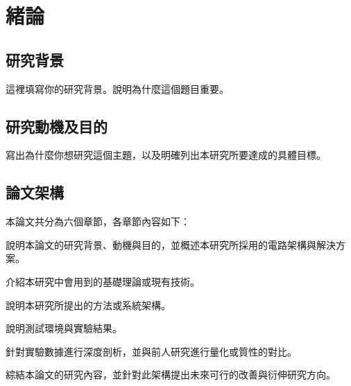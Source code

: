 \chapter{緒論}
\label{cha:CH1-Introduction} 

\section{研究背景}
這裡填寫你的研究背景。說明為什麼這個題目重要。

\section{研究動機及目的}
寫出為什麼你想研究這個主題，以及明確列出本研究所要達成的具體目標。

\section{論文架構}
本論文共分為六個章節，各章節內容如下：
\begin{description}[leftmargin=3.5em, style=nextline]
    \item[\textbf{\cref{cha:CH1-Introduction} \nameref{cha:CH1-Introduction}}] 
    說明本論文的研究背景、動機與目的，並概述本研究所採用的電路架構與解決方案。
    \item[\textbf{\cref{cha:CH2-Relative-Work} \nameref{cha:CH2-Relative-Work}}] 
    介紹本研究中會用到的基礎理論或現有技術。
    \item[\textbf{\cref{cha:CH3-Method} \nameref{cha:CH3-Method}}] 
    說明本研究所提出的方法或系統架構。
    \item[\textbf{\cref{cha:CH4-Result} \nameref{cha:CH4-Result}}] 
    說明測試環境與實驗結果。
    \item[\textbf{\cref{cha:CH5-Discussion} \nameref{cha:CH5-Discussion}}] 
    針對實驗數據進行深度剖析，並與前人研究進行量化或質性的對比。
    \item[\textbf{\cref{cha:CH6-Conclusion} \nameref{cha:CH6-Conclusion}}] 
    綜結本論文的研究內容，並針對此架構提出未來可行的改善與衍伸研究方向。
\end{description}